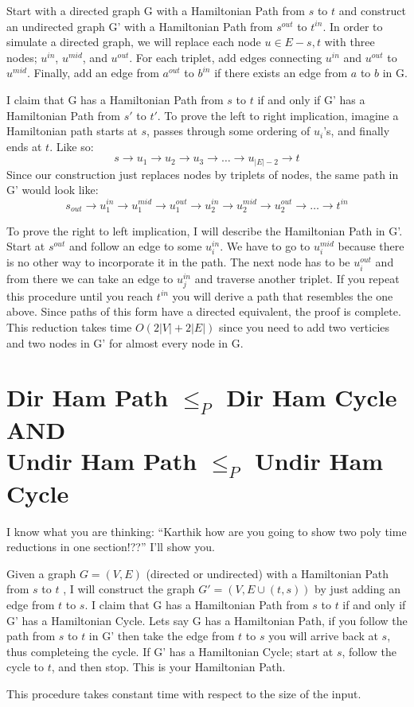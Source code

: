 \documentclass[11pt]{article}
\begin{document}
Start with a directed graph G with a Hamiltonian Path from $s$ to $t$ and construct an
undirected graph G' with a Hamiltonian Path from $s^{out}$ to $t^{in}$. In order to simulate a 
directed graph, we will replace each node $u \in E - {s,t}$ with three nodes; $u^{in}$, 
$u^{mid}$, and $u^{out}$. For each triplet, add edges connecting $u^{in}$ and $u^{out}$ 
to $u^{mid}$. Finally, add an edge from $a^{out}$ to $b^{in}$ if there exists an edge 
from $a$ to $b$ in G.

I claim that G has a Hamiltonian Path from $s$ to $t$ if and only if G' has a Hamiltonian Path from $s'$ to $t'$.
To prove the left to right implication, imagine a Hamiltonian path starts at $s$, 
passes through some ordering of $u_{i}$'s, and finally ends at $t$. Like so:
$$s \rightarrow u_{1} \rightarrow u_{2} \rightarrow u_{3} \rightarrow \dots \rightarrow u_{|E|-2} \rightarrow t$$
Since our construction just replaces nodes by triplets of nodes, the same path in G' would look 
like:
$$s_{out} \rightarrow u_{1}^{in} \rightarrow u_{1}^{mid} \rightarrow u_{1}^{out} \rightarrow u_{2}^{in} \rightarrow u_{2}^{mid} \rightarrow 
u_{2}^{out} \rightarrow \dots \rightarrow t^{in}$$

To prove the right to left implication, I will describe the Hamiltonian Path in G'. 
Start at $s^{out}$ and follow an edge to some $u_i^{in}$. We have to go to $u_i^{mid}$ 
because there is no other way to incorporate it in the path. The next node has to be
$u_i^{out}$ and from there we can take an edge to $u_j^{in}$ and traverse another triplet.
 If you repeat this procedure until you reach $t^{in}$ you will derive a path that 
resembles the one above. Since paths of this form have a directed equivalent, the proof is
complete. This reduction takes time $O(2|V| + 2|E|)$ since you need to add two verticies
and two nodes in G' for almost every node in G.

\section{Dir Ham Path $\leq_P$ Dir Ham Cycle \textbf{AND} \\ Undir Ham Path $\leq_P$ Undir Ham Cycle}
I know what you are thinking: ``Karthik how are you going to show two poly time reductions
in one section!??'' I'll show you.

Given a graph $G = (V,E)$ (directed or undirected) with a Hamiltonian Path from $s$ to $t$ , I will construct
 the graph $G' = (V,E \cup {(t,s)})$ by just adding an edge from $t$ to $s$. I claim 
that G has a Hamiltonian Path from $s$ to $t$ if and only if G' has a Hamiltonian 
Cycle. Lets say G has a Hamiltonian Path, if you follow the path from $s$ to $t$ in G'
then take the edge from $t$ to $s$ you will arrive back at $s$, thus completeing the 
cycle. If G' has a Hamiltonian Cycle; start at $s$, follow the cycle to $t$, and then 
stop. This is your Hamiltonian Path. 

This procedure takes constant time with respect to the size of the input.
\end{document}

